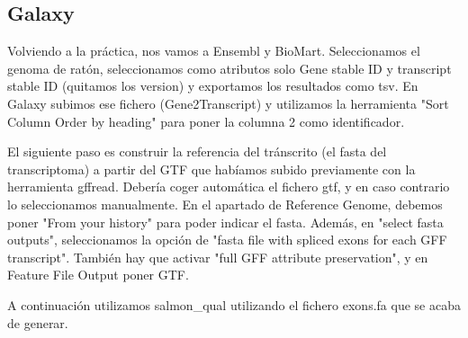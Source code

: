 \subsection{Galaxy}
Volviendo a la práctica, nos vamos a Ensembl y BioMart. Seleccionamos el genoma de ratón, seleccionamos como atributos solo Gene stable ID y transcript stable ID (quitamos los version) y exportamos los resultados como tsv. En Galaxy subimos ese fichero (Gene2Transcript) y utilizamos la herramienta "Sort Column Order by heading" para poner la columna 2 como identificador. 

El siguiente paso es construir la referencia del tránscrito (el fasta del transcriptoma) a partir del GTF que habíamos subido previamente con la herramienta gffread. Debería coger automática el fichero gtf, y en caso contrario lo seleccionamos manualmente. En el apartado de Reference Genome, debemos poner "From your history" para poder indicar el fasta. Además, en "select fasta outputs", seleccionamos la opción de "fasta file with spliced exons for each GFF transcript". También hay que activar "full GFF attribute preservation", y en Feature File Output poner GTF.

A continuación utilizamos salmon\_qual utilizando el fichero exons.fa que se acaba de generar.

%
